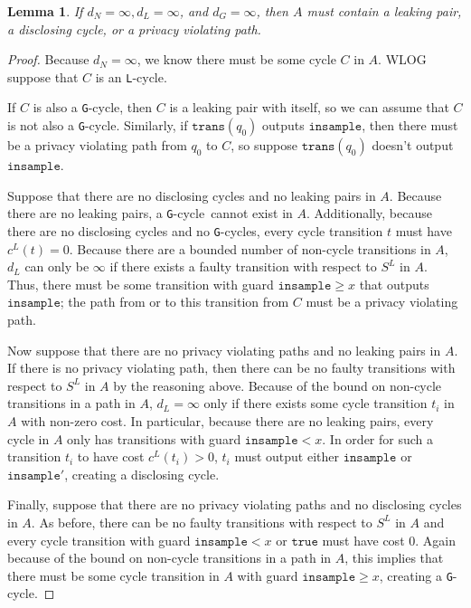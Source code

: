\documentclass[12pt]{article}
\newcommand{\gguard}[1][x]{\texttt{insample}\geq #1}
\newcommand{\lguard}[1][x]{\texttt{insample} < #1}
\newcommand{\trans}{\texttt{trans}}
\newcommand{\gcycle}{\texttt{G}-cycle}
\newcommand{\lcycle}{\texttt{L}-cycle}
\newtheorem{lemma}[thm]{Lemma}
\theoremstyle{definition}
\begin{document}
\begin{lemma}\label{LSAnocouplingsnotwellformed}
    If $d_N =\infty, d_L=\infty$, and $d_G=\infty$, then $A$ must contain a leaking pair, a disclosing cycle, or a privacy violating path. 
\end{lemma}
\begin{proof}
    Because $d_N = \infty$, we know there must be some cycle $C$ in $A$. WLOG suppose that $C$ is an \lcycle. 
    
    If $C$ is also a \gcycle, then $C$ is a leaking pair with itself, so we can assume that $C$ is not also a \gcycle. Similarly, if $\trans(q_0)$ outputs $\texttt{insample}$, then there must be a privacy violating path from $q_0$ to $C$, so suppose $\trans(q_0)$ doesn't output $\texttt{insample}$. 

    Suppose that there are no disclosing cycles and no leaking pairs in $A$. Because there are no leaking pairs, a \gcycle~cannot exist in $A$. Additionally, because there are no disclosing cycles and no \gcycle{}s, every cycle transition $t$ must have $c^L(t) = 0$. Because there are a bounded number of non-cycle transitions in $A$, $d_L$ can only be $\infty$ if there exists a faulty transition with respect to $S^L$ in $A$. 
    Thus, there must be some transition with guard $\gguard$ that outputs $\texttt{insample}$; the path from or to this transition from $C$ must be a privacy violating path. 

    Now suppose that there are no privacy violating paths and no leaking pairs in $A$. If there is no privacy violating path, then there can be no faulty transitions with respect to $S^L$ in $A$ by the reasoning above. Because of the bound on non-cycle transitions in a path in $A$, $d_L=\infty$ only if there exists some cycle transition $t_i$ in $A$ with non-zero cost. 
    In particular, because there are no leaking pairs, every cycle in $A$ only has transitions with guard $\lguard$. In order for such a transition $t_i$ to have cost $c^L(t_i) > 0$, $t_i$ must output either $\texttt{insample}$ or $\texttt{insample}'$, creating a disclosing cycle.

    Finally, suppose that there are no privacy violating paths and no disclosing cycles in $A$. As before, there can be no faulty transitions with respect to $S^L$ in $A$ and every cycle transition with guard $\lguard$ or $\texttt{true}$ must have cost 0. Again because of the bound on non-cycle transitions in a path in $A$, this implies that there must be some cycle transition in $A$ with guard $\gguard$, creating a \gcycle.
\end{proof}
\end{document}
